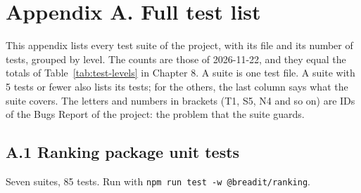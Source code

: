 \setlength{\emergencystretch}{3em}

\section*{Appendix A. Full test list}

This appendix lists every test suite of the project, with its file and its number of tests, grouped by level. The counts are those of 2026-11-22, and they equal the totals of Table~\ref{tab:test-levels} in Chapter 8. A suite is one test file. A suite with 5 tests or fewer also lists its tests; for the others, the last column says what the suite covers. The letters and numbers in brackets (T1, S5, N4 and so on) are IDs of the Bugs Report of the project: the problem that the suite guards.

\subsection*{A.1 Ranking package unit tests}

Seven suites, 85 tests. Run with \texttt{npm run test -w @breadit/ranking}.

